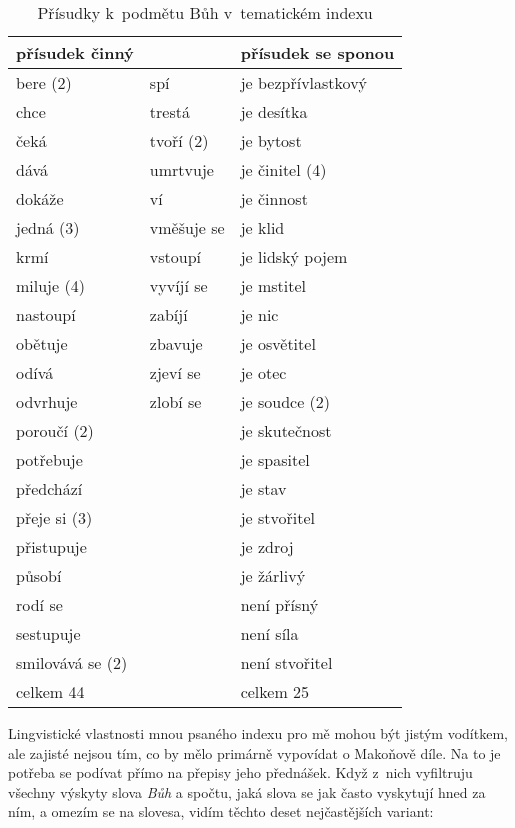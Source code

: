 \begin{table}[htpb]
\begin{center}
\begin{tabular}{|l l|l|}
\hline
přísudek činný & & přísudek se sponou \\
\hline
bere (2\texttimes{})	& spí	& je bezpřívlastkový	\\
chce	& trestá	& je desítka	\\
čeká	& tvoří (2\texttimes{})	& je bytost	\\
dává	& umrtvuje	& je činitel (4\texttimes{})	\\
dokáže	& ví	& je činnost	\\
jedná (3\texttimes{})	& vměšuje se	& je klid	\\
krmí	& vstoupí	& je lidský pojem	\\
miluje (4\texttimes{})	& vyvíjí se	& je mstitel	\\
nastoupí	& zabíjí	& je nic	\\
obětuje 	& zbavuje	& je osvětitel	\\
odívá 	& zjeví se	& je otec	\\
odvrhuje 	& zlobí se	& je soudce (2\texttimes{})	\\
poroučí (2\texttimes{})	&	& je skutečnost	\\
potřebuje 	&	& je spasitel	\\
předchází 	&	& je stav	\\
přeje si (3\texttimes{})	&	& je stvořitel	\\
přistupuje 	&	& je zdroj	\\
působí 	&	& je žárlivý	\\
rodí se 	&	& není přísný	\\
sestupuje 	&	& není síla	\\
smilovává se (2\texttimes{})	&	& není stvořitel	\\
\hline
celkem 44	&	& celkem 25	\\
\hline
\end{tabular}
\caption{Přísudky k~podmětu Bůh v~tematickém indexu}
\label{tab:topicidx-god-verbs}
\end{center}
\end{table}

Lingvistické vlastnosti mnou psaného indexu pro mě mohou být jistým vodítkem,
ale zajisté nejsou tím, co by mělo primárně vypovídat o Makoňově díle. Na to je
potřeba se podívat přímo na přepisy jeho přednášek. Když z~nich vyfiltruju
všechny výskyty slova \textit{Bůh} a spočtu, jaká slova se jak často vyskytují
hned za ním, a omezím se na slovesa, vidím těchto deset nejčastějších variant:

